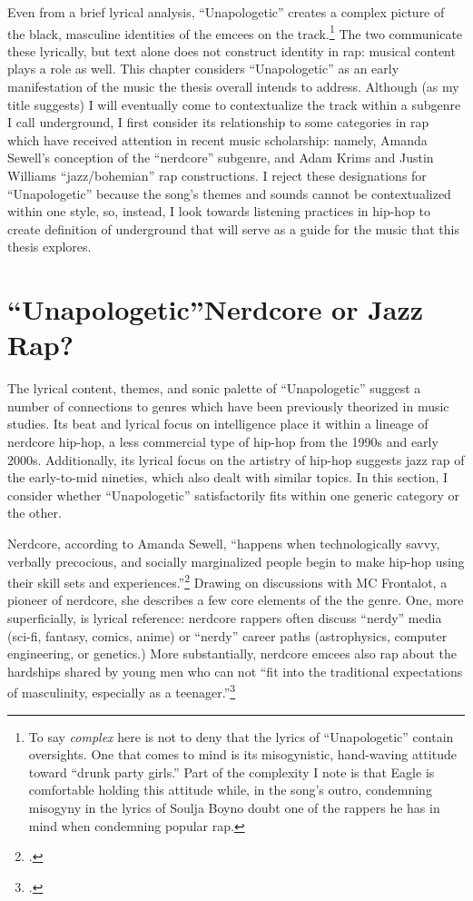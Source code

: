 Even from a brief lyrical analysis, ``Unapologetic'' creates a complex picture of the black,
masculine identities of the emcees on the track.\footnote{
    To say \emph{complex} here is not to deny that the lyrics of ``Unapologetic'' contain
    oversights. One that comes to mind is its misogynistic, hand-waving attitude toward
    ``drunk party girls.'' Part of the complexity I note is that Eagle is comfortable holding
    this attitude while, in the song's outro, condemning misogyny in the lyrics of Soulja
    Boy\textemdash no doubt one of the rappers he has in mind when condemning popular rap.} 
The two communicate these lyrically, but text alone does not construct identity in rap: musical
content plays a role as well. This chapter considers ``Unapologetic''  as an early manifestation
of the music the thesis overall intends to address. Although (as my title suggests) I will eventually
come to contextualize the track within a subgenre I call underground, I first consider its relationship
to some categories in rap which have received attention in recent music scholarship: namely, Amanda
Sewell's conception of the ``nerdcore'' subgenre, and Adam Krims  and Justin Williams ``jazz/bohemian'' 
rap  constructions. I reject these designations for  ``Unapologetic'' because the song's themes and 
sounds cannot be contextualized within one style, so, instead, I look towards listening practices 
in hip-hop to create definition of underground that will serve as a guide for the music that this
thesis explores.

\section{``Unapologetic''\textemdash Nerdcore or Jazz Rap?} \label{unapologeticnerdcorejazz}

The lyrical content, themes, and sonic palette of ``Unapologetic'' suggest a number of connections 
to genres which have been previously theorized in music studies. Its beat and lyrical focus on 
intelligence place it within a lineage of nerdcore hip-hop, a less commercial type of hip-hop from
the 1990s and early 2000s. Additionally, its lyrical focus on the artistry of hip-hop suggests jazz rap
of the early-to-mid nineties, which also dealt  with similar topics. In this section, I consider 
whether ``Unapologetic'' satisfactorily fits within one generic category or the other.

Nerdcore, according to Amanda Sewell, ``happens when technologically savvy, verbally precocious, and \sloppy
socially marginalized people begin to make hip-hop using their skill sets and 
experiences.''\footnote{
    \autocite[223]{amandasewellNerdcoreHiphop2015}.} 
Drawing on discussions with MC Frontalot, a pioneer of nerdcore, she describes a few core elements
of the  the genre. One, more superficially, is lyrical reference: nerdcore rappers often discuss
``nerdy'' media  (sci-fi, fantasy, comics, anime) or ``nerdy'' career paths (astrophysics, computer
engineering, or genetics.) More substantially, nerdcore emcees also rap about the hardships shared
by young men who can not ``fit into the traditional expectations of masculinity, especially as a 
teenager.''\footnote{
    \autocite[225]{amandasewellNerdcoreHiphop2015}.} 

